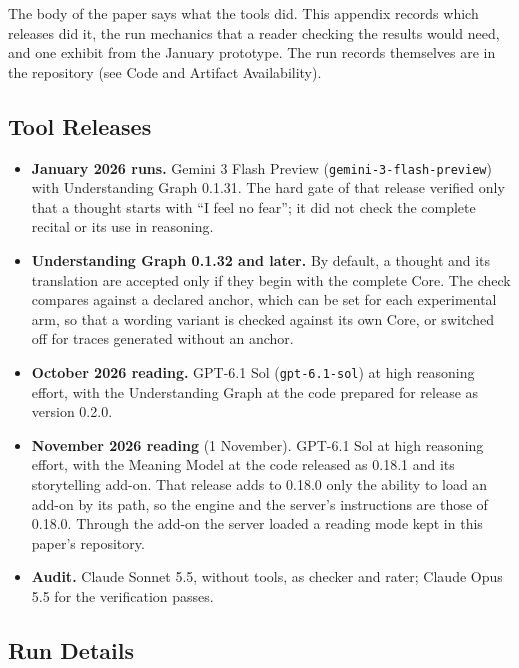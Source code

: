 \documentclass[11pt]{article}
\begin{document}
The body of the paper says what the tools did. This appendix records which
releases did it, the run mechanics that a reader checking the results would
need, and one exhibit from the January prototype. The run records themselves
are in the repository (see Code and Artifact Availability).

\subsection{Tool Releases}\label{app:releases}

\begin{itemize}[leftmargin=*,itemsep=0.3em]
    \item \textbf{January 2026 runs.} Gemini 3 Flash Preview
    (\texttt{gemini-3-flash-preview}) with Understanding Graph 0.1.31. The hard
    gate of that release verified only that a thought starts with
    \enquote{I feel no fear}; it did not check the complete recital or its use
    in reasoning.
    \item \textbf{Understanding Graph 0.1.32 and later.} By default, a thought
    and its translation are accepted only if they begin with the complete Core.
    The check compares against a declared anchor, which can be set for each
    experimental arm, so that a wording variant is checked against its own
    Core, or switched off for traces generated without an anchor.
    \item \textbf{October 2026 reading.} GPT-6.1 Sol (\texttt{gpt-6.1-sol}) at
    high reasoning effort, with the Understanding Graph at the code prepared
    for release as version 0.2.0.
    \item \textbf{November 2026 reading} (1 November). GPT-6.1 Sol at high
    reasoning effort, with the Meaning Model at the code released as 0.18.1
    and its storytelling add-on. That release adds to 0.18.0 only the ability
    to load an add-on by its path, so the engine and the server's instructions
    are those of 0.18.0. Through the add-on the server loaded a reading mode
    kept in this paper's repository.
    \item \textbf{Audit.} Claude Sonnet 5.5, without tools, as checker and
    rater; Claude Opus 5.5 for the verification passes.
\end{itemize}

\subsection{Run Details}\label{app:run-details}
\end{document}
